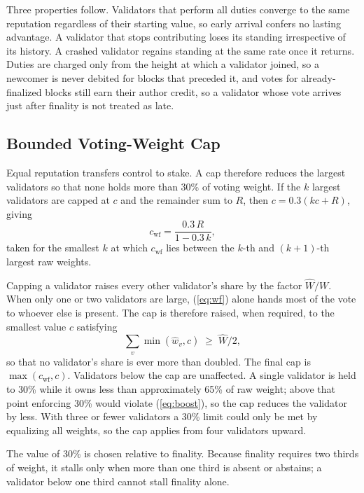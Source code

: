 \documentclass[conference]{IEEEtran}
\begin{document}
Three properties follow. Validators that perform all duties converge to the same reputation regardless of their starting value, so early arrival confers no lasting advantage. A validator that stops contributing loses its standing irrespective of its history. A crashed validator regains standing at the same rate once it returns. Duties are charged only from the height at which a validator joined, so a newcomer is never debited for blocks that preceded it, and votes for already-finalized blocks still earn their author credit, so a validator whose vote arrives just after finality is not treated as late.

\subsection{Bounded Voting-Weight Cap}\label{sec:cap}
Equal reputation transfers control to stake. A cap therefore reduces the largest validators so that none holds more than 30\% of voting weight. If the $k$ largest validators are capped at $c$ and the remainder sum to $R$, then $c = 0.3(kc + R)$, giving
\begin{equation}
c_{\mathrm{wf}} = \frac{0.3\,R}{1 - 0.3\,k},
\label{eq:wf}
\end{equation}
taken for the smallest $k$ at which $c_{\mathrm{wf}}$ lies between the $k$-th and $(k{+}1)$-th largest raw weights.

Capping a validator raises every other validator's share by the factor $\hat W / W$. When only one or two validators are large, (\ref{eq:wf}) alone hands most of the vote to whoever else is present. The cap is therefore raised, when required, to the smallest value $c$ satisfying
\begin{equation}
\textstyle\sum_v \min(\hat w_v, c) \;\geq\; \hat W / 2,
\label{eq:boost}
\end{equation}
so that no validator's share is ever more than doubled. The final cap is $\max(c_{\mathrm{wf}}, c)$. Validators below the cap are unaffected. A single validator is held to 30\% while it owns less than approximately 65\% of raw weight; above that point enforcing 30\% would violate (\ref{eq:boost}), so the cap reduces the validator by less. With three or fewer validators a 30\% limit could only be met by equalizing all weights, so the cap applies from four validators upward.

The value of 30\% is chosen relative to finality. Because finality requires two thirds of weight, it stalls only when more than one third is absent or abstains; a validator below one third cannot stall finality alone.
\end{document}
